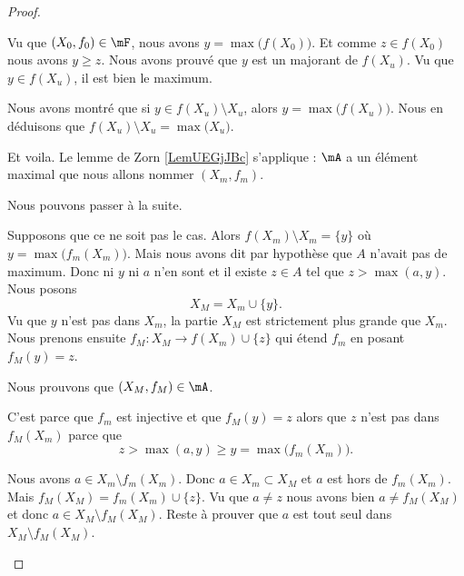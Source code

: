 \begin{proof}
\begin{subproof}
\begin{subproof}
			Vu que \( (X_0,f_0)\in \mF\), nous avons \( y=\max\big( f(X_0) \big)\). Et comme \( z\in f(X_0)\) nous avons \( y\geq z\). Nous avons prouvé que \( y\) est un majorant de \( f(X_u)\). Vu que \( y\in f(X_u)\), il est bien le maximum.

			Nous avons montré que si \( y\in f(X_u)\setminus X_u\), alors \( y=\max\big( f(X_u) \big)\). Nous en déduisons que \( f(X_u)\setminus X_u=\max\big( X_u \big)\).
		\end{subproof}
	\end{subproof}
	Et voila. Le lemme de Zorn \ref{LemUEGjJBc} s'applique : \( \mA\) a un élément maximal que nous allons nommer \( (X_m,f_m)\).

	Nous pouvons passer à la suite.
	\begin{subproof}
		\spitem[	\( f(X_m)\setminus X_m=\emptyset\)]

		Supposons que ce ne soit pas le cas. Alors \( f(X_m)\setminus X_m=\{ y \}\) où \( y=\max\big( f_m(X_m) \big)\). Mais nous avons dit par hypothèse que \( A\) n'avait pas de maximum. Donc ni \( y\) ni \( a\) n'en sont et il existe \( z\in A\) tel que \( z>\max(a,y)\). Nous posons
		\begin{equation}
			X_M=X_m\cup\{ y \}.
		\end{equation}
		Vu que \( y\) n'est pas dans \( X_m\), la partie \( X_M\) est strictement plus grande que \( X_m\). Nous prenons ensuite \(f_M \colon X_M\to f(X_m)\cup \{ z \}  \) qui étend \( f_m\) en posant \( f_M(y)=z\).

		Nous prouvons que \( (X_M,f_M)\in\mA\).

		\begin{subproof}
			C'est parce que \( f_m\) est injective et que \( f_M(y)=z\) alors que \( z\) n'est pas dans \( f_M(X_m)\) parce que
			\begin{equation}
				z>\max(a,y)\geq y=\max\big( f_m(X_m) \big).
			\end{equation}

			\spitem[\( X_M\setminus f_M(X_M)=\lbrace a \rbrace\)]
			Nous avons \( a\in X_m\setminus f_m(X_m)\). Donc \( a\in X_m\subset X_M\) et \( a\) est hors de \( f_m(X_m)\). Mais \( f_M(X_M)=f_m(X_m)\cup\{ z \}\). Vu que \( a\neq z\) nous avons bien \( a\neq f_M(X_M)\) et donc \( a\in X_M\setminus f_M(X_M)\). Reste à prouver que \( a\) est tout seul dans \( X_M\setminus f_M(X_M)\).


\end{subproof}
\end{subproof}
\end{proof}
